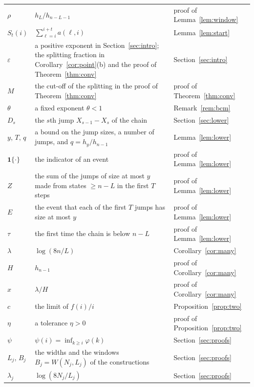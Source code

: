 \documentclass[11pt]{amsart}
\theoremstyle{remark}
\numberwithin{equation}{section}
\newcommand{\ind}{\mathbf{1}}
\begin{document}
\begin{longtable}{@{}lp{}p{}@{}}
$\rho$ & $h_L/h_{n-L-1}$ & proof of Lemma~\ref{lem:window}\\
$S_t(i)$ & $\sum_{\ell=i}^{i+t}a(\ell,i)$ & Lemma~\ref{lem:start}\\
$\varepsilon$ & a positive exponent in Section~\ref{sec:intro}; the splitting fraction in Corollary~\ref{cor:point}(b) and the proof of Theorem~\ref{thm:conv} & Section~\ref{sec:intro}\\
$M$ & the cut-off of the splitting in the proof of Theorem~\ref{thm:conv} & proof of Theorem~\ref{thm:conv}\\
$\theta$ & a fixed exponent $\theta<1$ & Remark~\ref{rem:bcm}\\
$D_s$ & the $s$th jump $X_{s-1}-X_s$ of the chain & Section~\ref{sec:lower}\\
$y$, $T$, $q$ & a bound on the jump sizes, a number of jumps, and $q=h_y/h_{n-1}$ & Lemma~\ref{lem:lower}\\
$\ind\{\cdot\}$ & the indicator of an event & proof of Lemma~\ref{lem:lower}\\
$Z$ & the sum of the jumps of size at most $y$ made from states $\ge n-L$ in the first $T$ steps & proof of Lemma~\ref{lem:lower}\\
$E$ & the event that each of the first $T$ jumps has size at most $y$ & proof of Lemma~\ref{lem:lower}\\
$\tau$ & the first time the chain is below $n-L$ & proof of Lemma~\ref{lem:lower}\\
$\lambda$ & $\log(8n/L)$ & Corollary~\ref{cor:many}\\
$H$ & $h_{n-1}$ & proof of Corollary~\ref{cor:many}\\
$x$ & $\lambda/H$ & proof of Corollary~\ref{cor:many}\\
$c$ & the limit of $f(i)/i$ & Proposition~\ref{prop:two}\\
$\eta$ & a tolerance $\eta>0$ & proof of Proposition~\ref{prop:two}\\
$\psi$ & $\psi(i)=\inf_{k\ge i}\varphi(k)$ & Section~\ref{sec:proofs}\\
$L_j$, $B_j$ & the widths and the windows $B_j=W(N_j,L_j)$ of the constructions & Section~\ref{sec:proofs}\\
$\lambda_j$ & $\log(8N_j/L_j)$ & Section~\ref{sec:proofs}\\
\bottomrule
\end{longtable}
\end{document}
